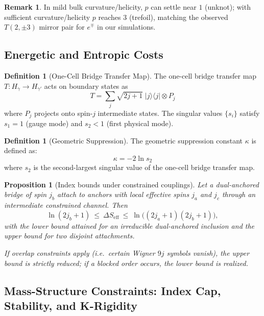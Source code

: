 \documentclass[11pt]{article}
\theoremstyle{plain}
\newtheorem{proposition}[theorem]{Proposition}
\theoremstyle{definition}
\newtheorem{definition}[theorem]{Definition}
\newtheorem{remark}[theorem]{Remark}
\begin{document}
\begin{remark}
  In mild bulk curvature/helicity, $p$ can settle near $1$ (unknot); with sufficient curvature/helicity $p$ reaches $3$ (trefoil), matching the observed $T(2,\pm3)$ mirror pair for $e^\mp$ in our simulations.
\end{remark}

\subsection{Energetic and Entropic Costs}
\begin{definition}[One-Cell Bridge Transfer Map]
  The one-cell bridge transfer map $T: H_\gamma \to H_{\gamma'}$ acts on boundary states as
  \begin{equation}
    T = \sum_{j} \sqrt{2j+1} \; |j\rangle\langle j| \otimes P_j
  \end{equation}
  where $P_j$ projects onto spin-$j$ intermediate states. The singular values $\{s_i\}$ satisfy $s_1 = 1$ (gauge mode) and $s_2 < 1$ (first physical mode).
\end{definition}

\begin{definition}[Geometric Suppression]
  The geometric suppression constant $\kappa$ is defined as:
  \begin{equation}
    \kappa = -2\ln s_2
  \end{equation}
  where $s_2$ is the second-largest singular value of the one-cell bridge transfer map.
\end{definition}

\begin{proposition}[Index bounds under constrained couplings]
  Let a dual-anchored bridge of spin $j_b$ attach to anchors with local effective spins $j_a$ and $j_c$ through an intermediate constrained channel. Then
  \[
    \ln(2j_b+1) \ \le\ \Delta S_{\mathrm{eff}}\ \le\ \ln\!\big((2j_a+1)(2j_b+1)\big),
  \]
  with the lower bound attained for an irreducible dual-anchored inclusion and the upper bound for two disjoint attachments.

  If overlap constraints apply (i.e.\ certain Wigner $9j$ symbols vanish), the upper bound is strictly reduced; if a blocked order occurs, the lower bound is realized.
\end{proposition}

\subsection{Mass-Structure Constraints: Index Cap, Stability, and K-Rigidity}\label{subsec:mass-constraints}
\end{document}
